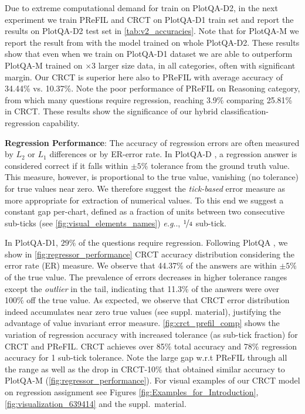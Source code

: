 \documentclass[runningheads]{llncs}
\makeatletter
\DeclareRobustCommand\onedot{\futurelet\@let@token\@onedot}
\def\@onedot{\ifx\@let@token.\else.\null\fi\xspace}
\def\eg{\emph{e.g}\onedot} \def\Eg{\emph{E.g}\onedot}
\makeatother
\begin{document}
Due to extreme computational demand for train on PlotQA-D2, in the next experiment we train PReFIL and CRCT on PlotQA-D1 train set and report the results on PlotQA-D2 test set in \cref{tab:v2_accuracies}. Note that for PlotQA-M we report the result from \cite{plotqa} with the model trained on whole PlotQA-D2. 
These results show that even when we train on PlotQA-D1 dataset we are able to outperform PlotQA-M trained on $\times$3 larger size data, in all categories, often with significant margin. Our CRCT is superior here also to PReFIL with average accuracy of 34.44\% vs. 10.37\%. Note the poor performance of PReFIL on Reasoning category, from which many questions require regression, reaching 3.9\% comparing 25.81\% in CRCT. These results show the significance of our hybrid classification-regression capability.


{\bf Regression Performance}: 
The accuracy of regression errors are often measured by $L_2$ or $L_1$ differences or by ER-error rate. 
In PlotQA-D \cite{plotqa}, a regression answer is considered correct if it falls within $\pm5\%$ tolerance from the ground truth value.
This measure, however, is proportional to the true value, vanishing (no tolerance) for true values near zero. We therefore suggest the \emph{tick-based} error measure as more appropriate for extraction of numerical values. To this end we suggest a constant gap per-chart, defined as a fraction of units between two consecutive sub-ticks (see \cref{fig:visual_elements_names}) \eg, $\nicefrac{1}{4}$ sub-tick.

In PlotQA-D1, $29\%$ of the questions require regression. Following PlotQA \cite{plotqa}, we show in \cref{fig:regressor_performance} CRCT accuracy distribution considering the error rate (ER) measure.
We observe that 44.37\% of the answers are within $\pm 5\%$ of the true value. The prevalence of errors decreases in higher tolerance ranges except the {\it outlier} in the tail, indicating that 11.3\% of the answers were over 100\% off the true value. As expected, we observe that CRCT error distribution indeed accumulates near zero true values (see suppl. material), justifying the advantage of value invariant error measure. \cref{fig:crct_prefil_comp} shows the variation of regression accuracy with increased tolerance (as sub-tick fraction) for CRCT and PReFIL. CRCT achieves over 85\% total accuracy and 78\% regression accuracy for 1 sub-tick tolerance. Note the large gap w.r.t PReFIL through all the range as well as the drop in CRCT-10\% that obtained similar accuracy to PlotQA-M (\cref{fig:regressor_performance}).
For visual examples of our CRCT model on regression assignment see Figures \ref{fig:Examples_for_Introduction}, \ref{fig:visualization_639414} and the suppl.~material.
\end{document}
